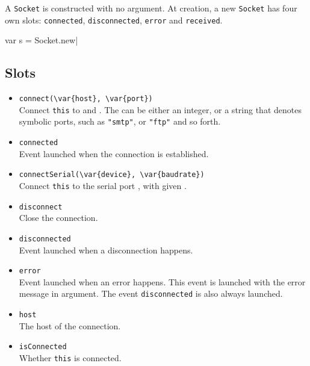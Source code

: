 A \lstinline|Socket| is constructed with no argument. At creation, a
new \lstinline|Socket| has four own slots: \lstinline|connected|,
\lstinline|disconnected|, \lstinline|error| and \lstinline|received|.

\begin{urbiscript}[firstnumber=last]
var s = Socket.new|
\end{urbiscript}

\subsection{Slots}
\begin{itemize}

\item \lstinline|connect(\var{host}, \var{port})|\\
  Connect \lstinline|this| to  and .  The
   can be either an integer, or a string that denotes
  symbolic ports, such as \lstinline|"smtp"|, or \lstinline|"ftp"| and
  so forth.

\item \lstinline|connected|\\
  Event launched when the connection is established.

\item \lstinline|connectSerial(\var{device}, \var{baudrate})|\\
  Connect \lstinline|this| to the serial port , with given
  .

\item \lstinline|disconnect|\\
  Close the connection.

\item \lstinline|disconnected|\\
  Event launched when a disconnection happens.

\item \lstinline|error|\\
  Event launched when an error happens. This event is launched with
  the error message in argument. The event \lstinline|disconnected| is
  also always launched.

\item \lstinline|host|\\
  The host of the connection.

\item \lstinline|isConnected|\\
  Whether \lstinline|this| is connected.


\end{itemize}
